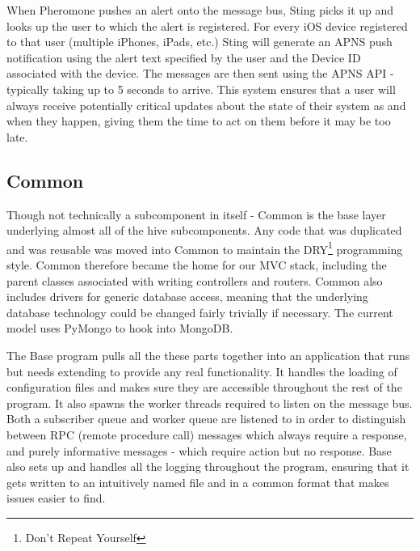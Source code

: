 When Pheromone pushes an alert onto the message bus, Sting picks it up and
looks up the user to which the alert is registered. For every iOS device
registered to that user (multiple iPhones, iPads, etc.) Sting will generate an
APNS push notification using the alert text specified by the user and the
Device ID associated with the device. The messages are then sent using the
APNS API - typically taking up to 5 seconds to arrive. This system ensures
that a user will always receive potentially critical updates about the state
of their system as and when they happen, giving them the time to act on them
before it may be too late.

\subsection{Common}

Though not technically a subcomponent in itself - Common is the base layer
underlying almost all of the hive subcomponents. Any code that was duplicated
and was reusable was moved into Common to maintain the DRY\footnote{Don’t Repeat Yourself} programming style.
Common therefore became the home for our MVC stack, including the parent classes
associated with writing controllers and routers. Common also includes drivers
for generic database access, meaning that the underlying database technology
could be changed fairly trivially if necessary. The current model uses
PyMongo\cite{pymongo} to hook into MongoDB.

The Base program pulls all the these parts together into an application that
runs but needs extending to provide any real functionality. It handles the
loading of configuration files and makes sure they are accessible throughout the
rest of the program. It also spawns the worker threads required to listen on the
message bus. Both a subscriber queue and worker queue are listened to in order
to distinguish between RPC (remote procedure call) messages which always require
a response, and purely informative messages - which require action but no
response. Base also sets up and handles all the logging throughout the program,
ensuring that it gets written to an intuitively named file and in a common
format that makes issues easier to find.
